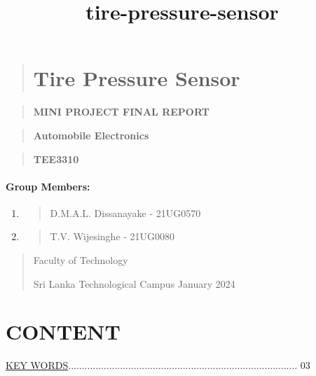\documentclass[
]{article}
\author{}
\date{}
\begin{document}
\begin{quote}
\centering
\title{tire-pressure-sensor}
\hypertarget{tire-pressure-sensor}{%
\section{Tire Pressure Sensor}\label{tire-pressure-sensor}}
\end{quote}

\begin{quote}
\centering
\textbf{\hypertarget{mini-project-final-report}{MINI PROJECT FINAL REPORT}}
\end{quote}

\begin{quote}
\centering
\textbf{Automobile Electronics}
\end{quote}

\begin{quote}
\centering
\textbf{TEE3310}
\end{quote}



\vfill
\hypertarget{group-members}{%
\paragraph{Group Members:}\label{group-members}}

\begin{enumerate}
\def\labelenumi{\arabic{enumi}.}
\item
  \begin{quote}
  D.M.A.L. Dissanayake - 21UG0570
  \end{quote}
\item
  \begin{quote}
  T.V. Wijesinghe - 21UG0080
  \end{quote}
\end{enumerate}
\vfill
\begin{quote}
\centering
Faculty of Technology

Sri Lanka Technological Campus
\vfill
January 2024
\newpage

\end{quote}

\hypertarget{content}{%
\section{CONTENT}\label{content}}

\protect\hyperlink{key-words}{KEY WORDS}.................................................................................... 03
\end{document}
